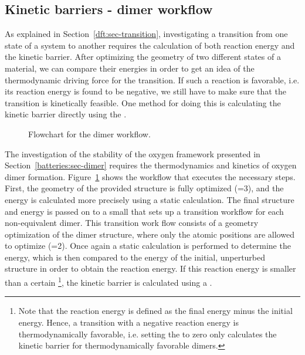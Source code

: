 \begin{refsection}
\subsection{Kinetic barriers - dimer workflow}

As explained in Section~\ref{dft:sec-transition}, investigating a transition from one state of a system to another requires the calculation of both reaction energy and the kinetic barrier. After optimizing the geometry of two different states of a material, we can compare their energies in order to get an idea of the thermodynamic driving force for the transition. If such a reaction is favorable, i.e. its reaction energy is found to be negative, we still have to make sure that the transition is kinetically feasible. One method for doing this is calculating the kinetic barrier directly using the .

\begin{figure}[ht!]
\centering

\caption{\label{automation:fig-dimer} Flowchart for the dimer workflow.}
\end{figure}

The investigation of the stability of the oxygen framework presented in Section~\ref{batteries:sec-dimer} requires the thermodynamics and kinetics of oxygen dimer formation. Figure~\ref{automation:fig-dimer} shows the workflow that executes the necessary steps. First, the geometry of the provided structure is fully optimized (=3), and the energy is calculated more precisely using a static calculation. The final structure and energy is passed on to a small  that sets up a transition workflow for each non-equivalent dimer. This transition work flow consists of a geometry optimization of the dimer structure, where only the atomic positions are allowed to optimize (=2). Once again a static calculation is performed to determine the energy, which is then compared to the energy of the initial, unperturbed structure in order to obtain the reaction energy. If this reaction energy is smaller than a certain \footnote{Note that the reaction energy is defined as the final energy minus the initial energy. Hence, a transition with a negative reaction energy is thermodynamically favorable, i.e. setting the  to zero only calculates the kinetic barrier for thermodynamically favorable dimers.}, the kinetic barrier is calculated using a .


\end{refsection}
